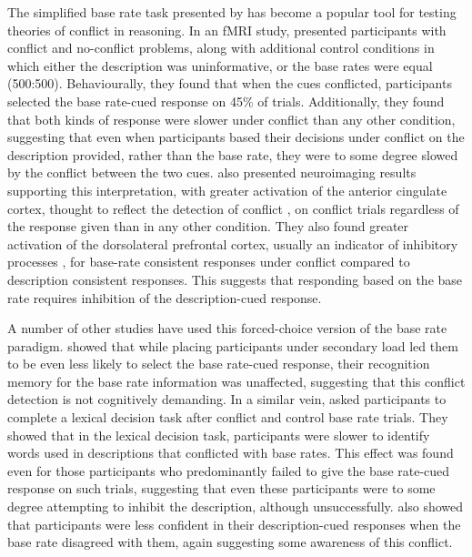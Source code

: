 The simplified base rate task presented by \citet{DeNeys2008}
has become a popular tool for testing theories of conflict in reasoning.
In an fMRI study, \citet{DeNeys2008a} presented participants with 
conflict and no-conflict problems,
along with additional control conditions in which either
the description was uninformative,
or the base rates were equal (500:500).
Behaviourally, they found that when the cues conflicted,
participants selected the base rate-cued response on 45\% of trials.
Additionally, they found that both kinds of response
were slower under conflict than any other condition,
suggesting that even when participants based their decisions 
under conflict on the description provided, rather than the base rate,
they were to some degree slowed by the conflict between the two cues.
\citet{DeNeys2008a} also presented neuroimaging results supporting this interpretation,
with greater activation of the anterior cingulate cortex,
thought to reflect the detection of conflict \citep{Botvinick2004a},
on conflict trials regardless of the response given than in any other condition.
They also found greater activation of the dorsolateral prefrontal cortex,
usually an indicator of inhibitory processes \citep{Aron2004},
for base-rate consistent responses under conflict
compared to description consistent responses.
This suggests that responding based on the base rate
requires inhibition of the description-cued response.

A number of other studies have used
this forced-choice version of the base rate paradigm.
\citet{Franssens2009} showed that while placing participants
under secondary load led them to be
even less likely to select the base rate-cued response,
their recognition memory for the base rate information was unaffected,
suggesting that this conflict detection is not cognitively demanding.
In a similar vein, \citet{DeNeys2009a} asked participants to complete 
a lexical decision task after conflict and control base rate trials.
They showed that in the lexical decision task,
participants were slower to identify words used
in descriptions that conflicted with base rates.
This effect was found even for those participants
who predominantly failed to give the base rate-cued response on such trials,
suggesting that even these participants were to some degree
attempting to inhibit the description, although unsuccessfully.
\citet{DeNeys2011b} also showed that participants were
less confident in their description-cued responses
when the base rate disagreed with them,
again suggesting some awareness of this conflict.

